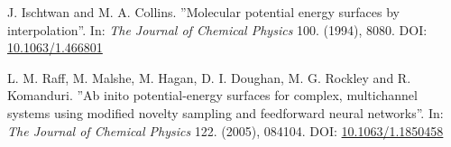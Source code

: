 \documentclass[twoside,english]{uiofysmaster}
\begin{document}
\begin{thebibliography}{56}
 J. Ischtwan and M. A. Collins.
 ''Molecular potential energy surfaces by interpolation''.
 In: \textit{The Journal of Chemical Physics} 100. (1994), 8080.
 DOI: \href{http://dx.doi.org/10.1063/1.466801}{10.1063/1.466801}
 
 L. M. Raff, M. Malshe, M. Hagan, D. I. Doughan, M. G. Rockley and R. Komanduri.
 ''Ab inito potential-energy surfaces for complex, multichannel systems using modified
 novelty sampling and feedforward neural networks''. 
 In: \textit{The Journal of Chemical Physics} 122. (2005), 084104. 
 DOI: \href{http://dx.doi.org/10.1063/1.1850458}{10.1063/1.1850458}
 

 
 
\end{thebibliography}
\end{document}
